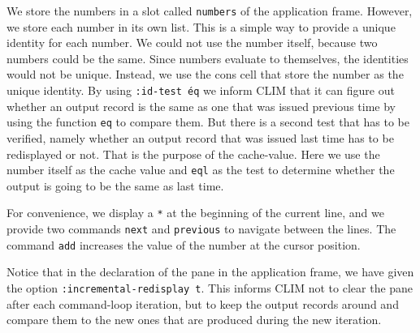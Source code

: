 We store the numbers in a slot called \texttt{numbers} of the
application frame.  However, we store each number in its own list.
This is a simple way to provide a unique identity for each number.  We
could not use the number itself, because two numbers could be the
same. Since numbers evaluate to themselves, the identities would not
be unique.  Instead, we use the cons cell that store the number as the
unique identity.  By using \texttt{:id-test \'eq} we inform CLIM that
it can figure out whether an output record is the same as one that was
issued previous time by using the function \texttt{eq} to compare
them.  But there is a second test that has to be verified, namely
whether an output record that was issued last time has to be
redisplayed or not.  That is the purpose of the cache-value.  Here we
use the number itself as the cache value and \texttt{eql} as the test
to determine whether the output is going to be the same as last time.

For convenience, we display a \texttt{*} at the beginning of the
current line, and we provide two commands \texttt{next} and
\texttt{previous} to navigate between the lines. The command
\texttt{add} increases the value of the number at the cursor position.

Notice that in the declaration of the pane in the application frame,
we have given the option \texttt{:incremental-redisplay t}.  This
informs CLIM not to clear the pane after each command-loop iteration,
but to keep the output records around and compare them to the new ones
that are produced during the new iteration.
